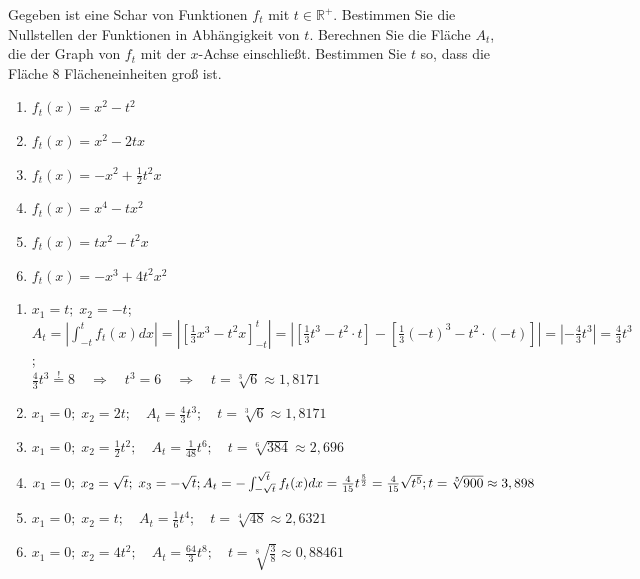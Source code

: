 \documentclass[12pt,a4paper,twoside,fleqn]{article}
\begin{document}
\begin{question}
  
  Gegeben ist eine Schar von Funktionen $f_t$ mit
  $t\in\mathbb{R}^+$. Bestimmen Sie die Nullstellen der Funktionen in
  Abhängigkeit von $t$. Berechnen Sie die Fläche $A_t$, die der Graph von
  $f_t$ mit der $x$-Achse einschließt. Bestimmen Sie $t$ so, dass die
  Fläche 8 Flächeneinheiten groß ist.
  \begin{multicols}{3}
      \begin{enumerate}
      \item $f_t(x)=x^2-t^2$
      \item $f_t(x)=x^2-2tx$
      \item $f_t(x)=-x^2 + \frac 1 2 t^2x$
      \item $f_t(x)=x^4-tx^2$
      \item $f_t(x)=tx^2-t^2x$
      \item $f_t(x)=-x^3 + 4t^2x^2$
      \end{enumerate}
    \end{multicols}
  \end{question}
  \begin{solution} \begin{multicols}{2}
    \begin{enumerate}
    \item $x_1=t;\;x_2=-t$;\\
      $A_t=|\int_{-t}^tf_t(x)dx|=
      |[\frac 1 3 x^3 - t^2x]_{-t}^t|=
      |[\frac 1 3 t^3 - t^2\cdot t] - [\frac 1 3 (-t)^3 - t^2\cdot (-t)]|
      =|-\frac 4 3 t^3|=\frac 4 3 t^3$;\\
      $\frac 4 3 t^3\overset{!}{=}8 \quad\Rightarrow\quad
      t^3= 6 \quad\Rightarrow\quad
      t=\sqrt[3]{6}\approx 1,8171$
    \item $x_1=0;\; x_2=2t;\quad A_t=\frac {4} 3 t^3;\quad
      t=\sqrt[3]{6}\approx 1,8171$
    \item $x_1=0;\; x_2=\frac 1 2 t^2; \quad A_t=\frac 1 {48} t^6; \quad
      t=\sqrt[6]{384}\approx 2,696$
    \item $x_1=0;\; x_2=\sqrt{t};\; x_3=-\sqrt{t};\\
      A_t=-\int_{-\sqrt{t}}^{\sqrt{t}}f_t(x)dx=
      \frac 4 {15}t^{\frac 5 2}=\frac 4 {15}\sqrt{t^5};\\
      t=\sqrt[5]{900}\approx 3,898$
    \item $x_1=0;\;x_2=t;\quad
      A_t=\frac 1 6 t^4;\quad
      t=\sqrt[4]{48}\approx 2,6321$
    \item $x_1=0;\;x_2=4t^2;\quad
      A_t=\frac{64} 3 t^8;\quad
      t=\sqrt[8]{\frac 3 8}\approx 0,88461$
    \end{enumerate}
  \end{multicols}
\end{solution}
  
\end{document}
